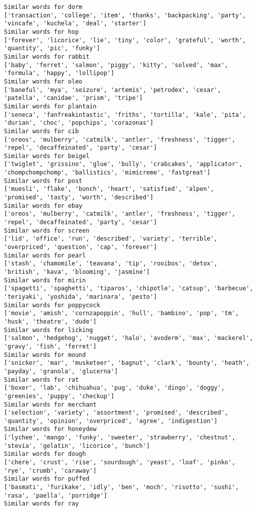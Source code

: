 \documentclass[11pt]{article}
\begin{document}
\begin{Verbatim}[commandchars=\\\{\}]
Similar words for dorm
['transaction', 'college', 'item', 'thanks', 'backpacking', 'party', 'vincafe', 'kuchela', 'deal', 'starter']
Similar words for hop
['forever', 'licorice', 'lie', 'tiny', 'color', 'grateful', 'worth', 'quantity', 'pic', 'funky']
Similar words for rabbit
['baby', 'ferret', 'salmon', 'piggy', 'kitty', 'solved', 'max', 'formula', 'happy', 'lollipop']
Similar words for oleo
['baneful', 'mya', 'seizure', 'artemis', 'petrodex', 'cesar', 'patella', 'canidae', 'prism', 'tripe']
Similar words for plantain
['seneca', 'fanfreakintastic', 'friths', 'tortilla', 'kale', 'pita', 'durian', 'choc', 'popchips', 'corazonas']
Similar words for cib
['oreos', 'mulberry', 'catmilk', 'antler', 'freshness', 'tigger', 'repel', 'decaffeinated', 'party', 'cesar']
Similar words for beigel
['twiglet', 'grissino', 'glue', 'bully', 'crabcakes', 'applicator', 'chompchompchomp', 'ballistics', 'mimicreme', 'fastgreat']
Similar words for post
['muesli', 'flake', 'bunch', 'heart', 'satisfied', 'alpen', 'promised', 'tasty', 'worth', 'described']
Similar words for ebay
['oreos', 'mulberry', 'catmilk', 'antler', 'freshness', 'tigger', 'repel', 'decaffeinated', 'party', 'cesar']
Similar words for screen
['lid', 'office', 'run', 'described', 'variety', 'terrible', 'overpriced', 'question', 'cap', 'forever']
Similar words for pearl
['stash', 'chamomile', 'teavana', 'tip', 'rooibos', 'detox', 'british', 'kava', 'blooming', 'jasmine']
Similar words for mirin
['spagetti', 'spaghetti', 'tiparos', 'chipotle', 'catsup', 'barbecue', 'teriyaki', 'yoshida', 'marinara', 'pesto']
Similar words for poppycock
['movie', 'amish', 'cornzapoppin', 'hull', 'bambino', 'pop', 'tm', 'husk', 'theatre', 'dude']
Similar words for licking
['salmon', 'hedgehog', 'nugget', 'halo', 'avoderm', 'max', 'mackerel', 'gravy', 'fish', 'ferret']
Similar words for mound
['snicker', 'mar', 'musketeer', 'bagnut', 'clark', 'bounty', 'heath', 'payday', 'granola', 'glucerna']
Similar words for rat
['boxer', 'lab', 'chihuahua', 'pug', 'duke', 'dingo', 'doggy', 'greenies', 'puppy', 'checkup']
Similar words for merchant
['selection', 'variety', 'assortment', 'promised', 'described', 'quantity', 'opinion', 'overpriced', 'agree', 'indigestion']
Similar words for honeydew
['lychee', 'mango', 'funky', 'sweeter', 'strawberry', 'chestnut', 'stevia', 'gelatin', 'licorice', 'bunch']
Similar words for dough
['chere', 'crust', 'rise', 'sourdough', 'yeast', 'loaf', 'pinko', 'rye', 'crumb', 'caraway']
Similar words for puffed
['basmati', 'furikake', 'idly', 'ben', 'moch', 'risotto', 'sushi', 'rasa', 'paella', 'porridge']
Similar words for ray

\end{Verbatim}
\end{document}
